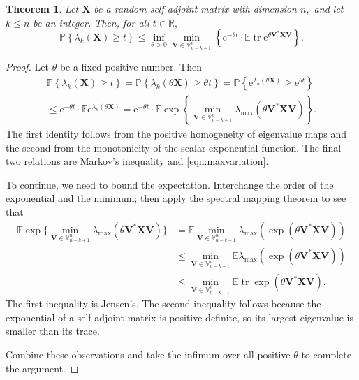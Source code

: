 \documentclass[11pt,letterpaper,twoside,reqno,nosumlimits]{amsart}
\renewcommand{\star}{*}
\newcommand{\mat}[1]{\ensuremath{\bm{#1}}} %
\newcommand{\e}{\ensuremath{\mathrm{e}}}
\newcommand{\E}{\ensuremath{\mathbb{E}}}
\newcommand{\Prob}[1]{\ensuremath{\mathbb{P}\left\{#1\right\}}}
\newcommand{\R}{\ensuremath{\mathbb{R}}}
\newcommand{\lambdamax}[1]{\ensuremath{\lambda_{\mathrm{max}}\left(#1\right)}}
\newcommand{\Isom}[2]{\ensuremath{\mathbb{V}_{#1}^{#2}}}
\DeclareMathOperator{\tr}{tr}
\newtheorem{thm}{Theorem}
\theoremstyle{remark}
\numberwithin{equation}{section}
\numberwithin{thm}{section}
\numberwithin{prop}{section}
\numberwithin{defn}{section}
\numberwithin{remark}{section}
\begin{document}
\begin{thm}
Let $\mat{X}$ be a random self-adjoint matrix with dimension $n,$ and let $k \leq n$ be an integer. Then, for all $t \in \R,$
\begin{equation}
\Prob{\lambda_k(\mat{X}) \geq t} \leq \inf_{\theta > 0} \min_{\mat{V} \in \Isom{n-k+1}{n}} \left\{ \e^{-\theta t} \cdot \E\tr\e^{\theta \mat{V}^\star\mat{XV}} \right\}.
\label{eqn:laplacetform}
\end{equation}
\label{thm:laplacetform}
\end{thm}

\begin{proof}
Let $\theta$ be a fixed positive number. Then
\begin{multline*}
\Prob{\lambda_k(\mat{X}) \geq t}  = 
\Prob{\lambda_k(\theta \mat{X}) \geq \theta t} = 
\Prob{\e^{\lambda_k(\theta \mat{X})} \geq \e^{\theta t}} \\
\leq  \e^{-\theta t} \cdot \E \e^{\lambda_k(\theta \mat{X})} = 
\e^{-\theta t} \cdot \E \exp\left\{\min_{\mat{V} \in \Isom{n-k+1}{n}} \lambdamax{\theta \mat{V}^\star\mat{XV}}\right\}. 
\end{multline*}
The first identity follows from the positive homogeneity of eigenvalue maps and the second from the monotonicity of the scalar exponential function. The final two relations are Markov's inequality and \eqref{eqn:maxvariation}.

To continue, we need to bound the expectation. Interchange the order of the exponential and the minimum; then apply the spectral mapping theorem to see that
\begin{align*}
 \E \exp\bigg\{\min_{\mat{V} \in \Isom{n-k+1}{n}} \lambdamax{\theta \mat{V}^\star \mat{XV}} \bigg\} & = \E \min_{\mat{V} \in \Isom{n-k+1}{n}} \lambdamax{\exp(\theta \mat{V}^\star\mat{XV})} \\
  & \leq \min_{\mat{V} \in \Isom{n-k+1}{n}} \E \lambdamax{\exp(\theta \mat{V}^\star\mat{XV})} \\
  & \leq \min_{\mat{V} \in \Isom{n-k+1}{n}} \E \tr \exp(\theta \mat{V}^\star\mat{XV}).
\end{align*}
The first inequality is Jensen's. The second inequality follows because the exponential of a self-adjoint matrix is positive definite, so its largest eigenvalue is smaller than its trace.

Combine these observations and take the infimum over all positive $\theta$ to complete the argument.
\end{proof}
\end{document}
